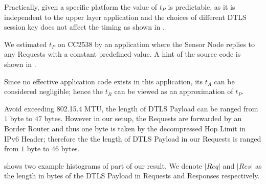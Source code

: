 Practically, given a specific platform the value of $t_P$ is predictable, as it is independent to the upper layer application and the choices of different DTLS session key does not affect the timing as shown in . 

We estimated $t_P$ on CC2538 by an application where the Sensor Node replies to any Requests with a constant predefined value. A hint of the source code is shown in .

 

Since no effective application code exists in this application, its $t_A$ can be considered negligible; hence the $t_R$ can be viewed as an approximation of $t_P$.

Avoid exceeding 802.15.4 MTU, the length of DTLS Payload can be ranged from $1$ byte to $47$ bytes. However in our setup, the Requests are forwarded by an Border Router and thus one byte is taken by the decompressed Hop Limit in IPv6 Header; therefore the the length of DTLS Payload in our Requests is ranged from $1$ byte to $46$ bytes.

 shows two example histograms of part of our result. We denote $|Req|$ and $|Res|$ as the length in bytes of the DTLS Payload in Requests and Responses respectively.

